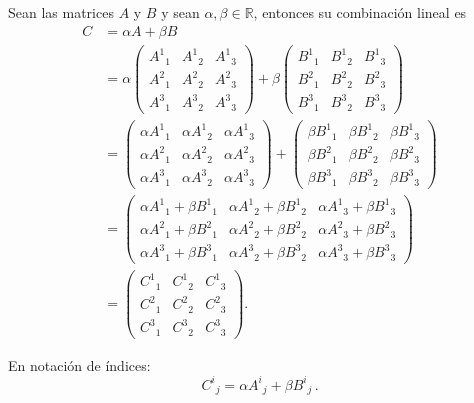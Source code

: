 \documentclass[../apunte_mecanica_clasica.tex]{subfiles}%
\begin{document}
Sean las matrices $A$ y $B$ y sean $\alpha, \beta \in \mathbb{R}$, 
entonces su combinación lineal es
\begin{align*}
    C &= \alpha A + \beta B \\[4pt]
    &=
\alpha
\begin{pmatrix}
    A^1{}_1 & A^1{}_2 & A^1{}_3 \\
    A^2{}_1 & A^2{}_2 & A^2{}_3 \\
    A^3{}_1 & A^3{}_2 & A^3{}_3
\end{pmatrix}
+
\beta
\begin{pmatrix}
    B^1{}_1 & B^1{}_2 & B^1{}_3 \\
    B^2{}_1 & B^2{}_2 & B^2{}_3 \\
    B^3{}_1 & B^3{}_2 & B^3{}_3
\end{pmatrix}\\[4pt]
&=
\begin{pmatrix}
    \alpha A^1{}_1 & \alpha A^1{}_2 & \alpha A^1{}_3 \\
    \alpha A^2{}_1 & \alpha A^2{}_2 & \alpha A^2{}_3 \\
    \alpha A^3{}_1 & \alpha A^3{}_2 & \alpha A^3{}_3
\end{pmatrix}
+
\begin{pmatrix}
    \beta B^1{}_1 & \beta B^1{}_2 & \beta B^1{}_3 \\
    \beta B^2{}_1 & \beta B^2{}_2 & \beta B^2{}_3 \\
    \beta B^3{}_1 & \beta B^3{}_2 & \beta B^3{}_3
\end{pmatrix}\\[4pt]
&=
\begin{pmatrix}
    \alpha A^1{}_1 + \beta B^1{}_1 & \alpha A^1{}_2 + \beta B^1{}_2 & \alpha A^1{}_3 + \beta B^1{}_3 \\
    \alpha A^2{}_1 + \beta B^2{}_1 & \alpha A^2{}_2 + \beta B^2{}_2 & \alpha A^2{}_3 + \beta B^2{}_3 \\
    \alpha A^3{}_1 + \beta B^3{}_1 & \alpha A^3{}_2 + \beta B^3{}_2 & \alpha A^3{}_3 + \beta B^3{}_3
\end{pmatrix}\\[4pt]
&=
\begin{pmatrix}
    C^1{}_1 & C^1{}_2 & C^1{}_3 \\
    C^2{}_1 & C^2{}_2 & C^2{}_3 \\
    C^3{}_1 & C^3{}_2 & C^3{}_3
\end{pmatrix}.
\end{align*}

En notación de índices:
\begin{equation*}
    C^i{}_j = \alpha A^i{}_j + \beta B^i{}_j \,.
\end{equation*}
\end{document}
